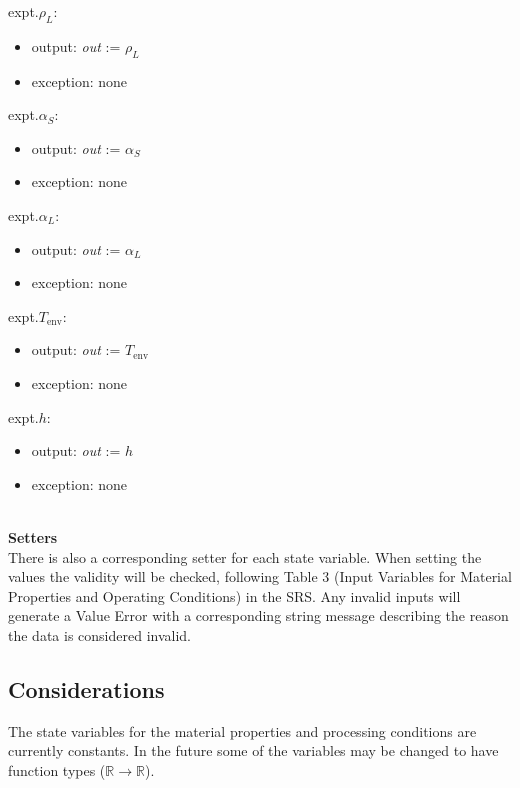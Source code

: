 \documentclass[12pt, titlepage]{article}
\begin{document}
\noindent expt.$\rho_L$:
\begin{itemize}
\item output: \textit{out} := $\rho_L$
\item exception: none
\end{itemize}

\noindent expt.$\alpha_S$:
\begin{itemize}
\item output: \textit{out} := $\alpha_S$
\item exception: none
\end{itemize}

\noindent expt.$\alpha_L$:
\begin{itemize}
\item output: \textit{out} := $\alpha_L$
\item exception: none
\end{itemize}

\noindent expt.$T_{\text{env}}$:
\begin{itemize}
\item output: \textit{out} := $T_{\text{env}}$
\item exception: none
\end{itemize}

\noindent expt.$h$:
\begin{itemize}
\item output: \textit{out} := $h$
\item exception: none
\end{itemize}
~\\

\noindent \textbf{Setters}\\

There is also a corresponding setter for each state variable.  When setting the
values the validity will be checked, following Table 3 (Input Variables for
Material Properties and Operating Conditions) in the SRS.  Any invalid inputs
will generate a Value Error with a corresponding string message describing the
reason the data is considered invalid.

\subsection{Considerations}

The state variables for the material properties and processing conditions are
currently constants.  In the future some of the variables may be changed to have
function types ($\mathbb{R} \rightarrow \mathbb{R}$).
\end{document}
